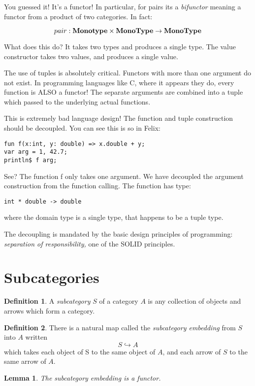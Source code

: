 \documentclass[oneside]{book}
\theoremstyle{plain}
\theoremstyle{definition}
\newtheorem{definition}{Definition}
\theoremstyle{plain}
\newtheorem{lemma}{Lemma}
\begin{document}
You guessed it! It's a functor! In particular, for pairs
its a {\em bifunctor} meaning a functor from a product of
two categories. In fact:

$$pair: {\bf Monotype } \times {\bf MonoType } \rightarrow {\bf MonoType}$$

What does this do? It takes two types and produces a single type.
The value constructor takes two values, and produces a single value.

The use of tuples is absolutely critical. Functors with more
than one argument do not exist. In programming languages like C,
where it appears they do, every function is ALSO a functor!
The separate arguments are combined into a tuple which passed to
the underlying actual functions.

This is extremely bad language design! The function and tuple
construction should be decoupled. You can see this is so in Felix:

\begin{verbatim}
fun f(x:int, y: double) => x.double + y;
var arg = 1, 42.7;
println$ f arg;
\end{verbatim}
 
See? The function f only takes one argument.
We have decoupled the argument construction from the function
calling. The function has type:
\begin{verbatim}
int * double -> double
\end{verbatim}
where the domain type is a single type, that happens to
be a tuple type.

The decoupling is mandated by the basic design principles
of programming: {\em separation of responsibility,} one of the
SOLID principles.

\section{Subcategories}
\begin{definition} A {\em subcategory} $S$ of a category $A$ is any collection
of objects and arrows which form a category.
\end{definition}
\begin{definition} There is a natural map called the {\em subcategory embedding} from
$S$ into $A$ written
$$S\hookrightarrow A$$
which takes each object of S to the same object of $A$, and each
arrow of $S$ to the same arrow of $A$.
\end{definition}

\begin{lemma} 
The subcategory embedding is a functor.
\end{lemma}
\end{document}
